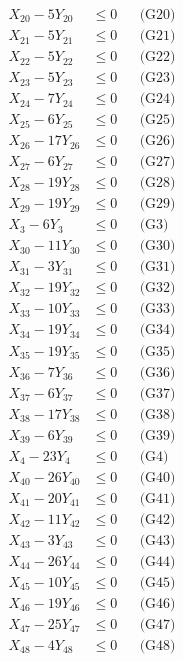 \documentclass[a4paper,10pt]{article}
\begin{document}
{\begin{align}
X_{20} - 5Y_{20} &\leq 0 && \text{(G20)} \\
X_{21} - 5Y_{21} &\leq 0 && \text{(G21)} \\
X_{22} - 5Y_{22} &\leq 0 && \text{(G22)} \\
\allowbreak
X_{23} - 5Y_{23} &\leq 0 && \text{(G23)} \\
X_{24} - 7Y_{24} &\leq 0 && \text{(G24)} \\
X_{25} - 6Y_{25} &\leq 0 && \text{(G25)} \\
X_{26} - 17Y_{26} &\leq 0 && \text{(G26)} \\
X_{27} - 6Y_{27} &\leq 0 && \text{(G27)} \\
X_{28} - 19Y_{28} &\leq 0 && \text{(G28)} \\
X_{29} - 19Y_{29} &\leq 0 && \text{(G29)} \\
X_{3} - 6Y_{3} &\leq 0 && \text{(G3)} \\
X_{30} - 11Y_{30} &\leq 0 && \text{(G30)} \\
X_{31} - 3Y_{31} &\leq 0 && \text{(G31)} \\
X_{32} - 19Y_{32} &\leq 0 && \text{(G32)} \\
X_{33} - 10Y_{33} &\leq 0 && \text{(G33)} \\
X_{34} - 19Y_{34} &\leq 0 && \text{(G34)} \\
X_{35} - 19Y_{35} &\leq 0 && \text{(G35)} \\
X_{36} - 7Y_{36} &\leq 0 && \text{(G36)} \\
X_{37} - 6Y_{37} &\leq 0 && \text{(G37)} \\
X_{38} - 17Y_{38} &\leq 0 && \text{(G38)} \\
X_{39} - 6Y_{39} &\leq 0 && \text{(G39)} \\
X_{4} - 23Y_{4} &\leq 0 && \text{(G4)} \\
X_{40} - 26Y_{40} &\leq 0 && \text{(G40)} \\
\allowbreak
X_{41} - 20Y_{41} &\leq 0 && \text{(G41)} \\
X_{42} - 11Y_{42} &\leq 0 && \text{(G42)} \\
X_{43} - 3Y_{43} &\leq 0 && \text{(G43)} \\
X_{44} - 26Y_{44} &\leq 0 && \text{(G44)} \\
X_{45} - 10Y_{45} &\leq 0 && \text{(G45)} \\
X_{46} - 19Y_{46} &\leq 0 && \text{(G46)} \\
X_{47} - 25Y_{47} &\leq 0 && \text{(G47)} \\
X_{48} - 4Y_{48} &\leq 0 && \text{(G48)} \\

\end{align}}
\end{document}
